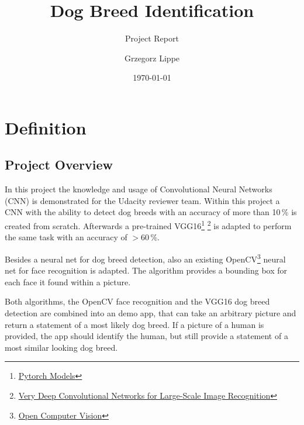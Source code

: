 \documentclass[paper=A4, DIV=10, parskip=half]{scrartcl}
\title{Dog Breed Identification}
\subtitle{Project Report}
\author{Grzegorz Lippe}
\date{\today}
\begin{document}
\maketitle


  
\section*{Definition}

\subsection*{Project Overview}

In this project the knowledge and usage of Convolutional Neural Networks (CNN)
is demonstrated for the Udacity reviewer team. Within this project a CNN with
the ability to detect dog breeds with an accuracy of more than 10\,\% is created
from scratch. Afterwards a pre-trained
VGG16\footnote{\href{https://pytorch.org/vision/0.8/models.html}{Pytorch Models}}
\footnote{\href{https://arxiv.org/abs/1409.1556}{Very Deep Convolutional
Networks for Large-Scale Image Recognition}} is adapted to perform the same task
with an accuracy of $>$60\,\%.

Besides a neural net for dog breed detection, also an existing
OpenCV\footnote{\href{https://opencv.org/}{Open Computer Vision}} neural net for
face recognition is adapted. The algorithm provides a bounding box for each face
it found within a picture.

Both algorithms, the OpenCV face recognition and the VGG16 dog breed detection
are combined into an demo app, that can take an arbitrary picture and return a
statement of a most likely dog breed. If a picture of a human is provided, the
app should identify the human, but still provide a statement of a most similar
looking dog breed.

\end{document}
